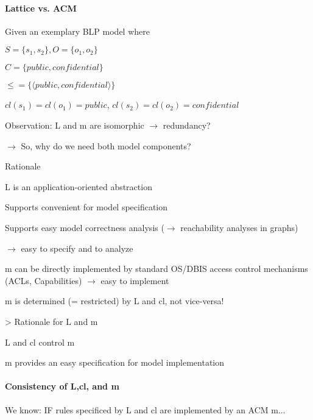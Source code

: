 \documentclass[a4paper]{article}
\begin{document}
\begin{multicols}{3}
    \paragraph{Lattice vs. ACM}
    Given an exemplary BLP model where
    \begin{itemize*}
        \item $S=\{s_1,s_2\}, O=\{o_1,o_2\}$
        \item $C=\{public,confidential\}$
        \item $\leq=\{⟨public,confidential⟩\}$
        \item $cl(s_1)=cl(o_1)=public$, $cl(s_2)=cl(o_2)=confidential$
        \item %
        \item Observation: L and m are isomorphic $\rightarrow$ redundancy?
        \item $\rightarrow$ So, why do we need both model components?
    \end{itemize*}

    Rationale
    \begin{itemize*}
        \item L is an application-oriented abstraction
              \begin{itemize*}
                  \item Supports convenient for model specification
                  \item Supports easy model correctness analysis ($\rightarrow$ reachability analyses in graphs)
                  \item $\rightarrow$ easy to specify and to analyze
              \end{itemize*}
        \item m can be directly implemented by standard OS/DBIS access control mechanisms (ACLs, Capabilities) $\rightarrow$ easy to implement
        \item m is determined (= restricted) by L and cl, not vice-versa!
    \end{itemize*}

    > Rationale for L and m
    \begin{itemize*}
        \item L and cl control m
        \item m provides an easy specification for model implementation
    \end{itemize*}

    \paragraph{Consistency of L,cl, and m}
    We know: IF rules specificed by L and cl are implemented by an ACM m...


\end{multicols}
\end{document}
